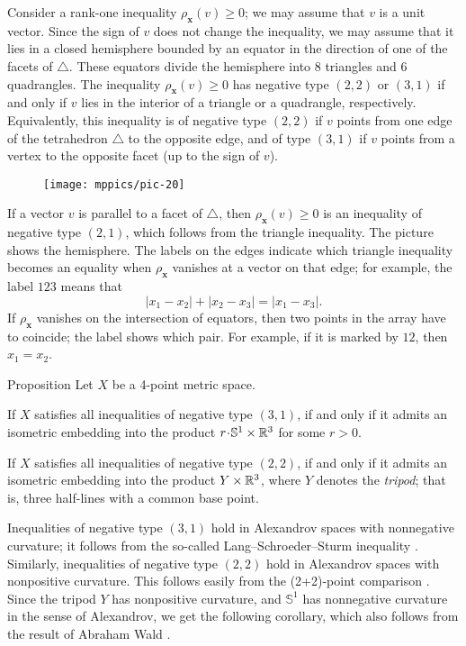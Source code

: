 \documentclass[a4paper,10pt]{article}
\begin{document}
Consider a rank-one inequality $\rho_{\bm{x}}(v)\ge 0$; we may assume that $v$ is a unit vector.
Since the sign of $v$ does not change the inequality, we may assume that it lies in a closed hemisphere bounded by an equator in the direction of one of the facets of $\triangle$.
These equators divide the hemisphere into 8 triangles and 6 quadrangles.
The inequality $\rho_{\bm{x}}(v)\ge 0$ has negative type $(2,2)$ or $(3,1)$
if and only if $v$ lies in the interior of a triangle or a quadrangle, respectively.
Equivalently, this inequality is of negative type $(2,2)$ if $v$ points from one edge of the tetrahedron $\triangle$ to the opposite edge, and of type $(3,1)$ if $v$ points from a vertex to the opposite facet (up to the sign of $v$).

\begin{wrapfigure}{o}{36mm}
\centering
\vskip-3mm
\texttt{[image: mppics/pic-20]}
\vskip-0mm
\end{wrapfigure}

If a vector $v$ is parallel to a facet of $\triangle$, then $\rho_{\bm{x}}(v)\ge 0$ is an inequality of negative type $(2,1)$, which follows from the triangle inequality.
The picture shows the hemisphere.
The labels on the edges indicate which triangle inequality becomes an equality when $\rho_{\bm{x}}$ vanishes at a vector on that edge;
for example, the label $123$ means that
\[|x_1-x_2|+|x_2-x_3|=|x_1-x_3|.\]
If $\rho_{\bm{x}}$ vanishes on the intersection of equators, then two points in the array have to coincide;
the label shows which pair.
For example, if it is marked by $12$, then $x_1=x_2$.

\begin{thm}{Proposition}\label{prop:Four-point arrays}
Let $X$ be a 4-point metric space.

If $X$ satisfies all inequalities of negative type $(3, 1)$, if and only if it admits an isometric embedding into the product $r\cdot \mathbb{S}^1\times\RR^3$ for some $r>0$.

If $X$ satisfies all inequalities of negative type $(2, 2)$, if and only if it admits an isometric embedding into the product $Y\times\mathbb{R}^3$, where $Y$ denotes the \emph{tripod};
that is, three half-lines with a common base point.
\end{thm}

Inequalities of negative type $(3, 1)$ hold in Alexandrov spaces with nonnegative curvature; it follows from the so-called Lang--Schroeder--Sturm inequality \cite{lang-schroeder, sturm}.
Similarly, inequalities of negative type $(2, 2)$ hold in Alexandrov spaces with nonpositive curvature.
This follows easily from the (2+2)-point comparison \cite[9.5]{AKP-2024}.
Since the tripod $Y$ has nonpositive curvature, and $\mathbb{S}^1$ has nonnegative curvature in the sense of Alexandrov, we get the following corollary, which also follows from the result of Abraham Wald \cite[§ 7]{wald}.
\end{document}
